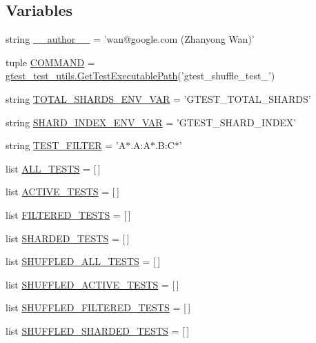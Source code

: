 \subsection*{\-Variables}
\begin{DoxyCompactItemize}
\item 
string \hyperlink{namespacegtest__shuffle__test_a629d61dfe4da763164a4d1a2d85b0afd}{\-\_\-\-\_\-author\-\_\-\-\_\-} = 'wan@google.\-com (\-Zhanyong \-Wan)'
\item 
tuple \hyperlink{namespacegtest__shuffle__test_add010199942a26d17bd560c1ce462eeb}{\-C\-O\-M\-M\-A\-N\-D} = \hyperlink{namespacegtest__test__utils_a1bdf3cac86afa675ed37629b183048e9}{gtest\-\_\-test\-\_\-utils.\-Get\-Test\-Executable\-Path}('gtest\-\_\-shuffle\-\_\-test\-\_\-')
\item 
string \hyperlink{namespacegtest__shuffle__test_a29eb92c501c01a11bd57180093e5548f}{\-T\-O\-T\-A\-L\-\_\-\-S\-H\-A\-R\-D\-S\-\_\-\-E\-N\-V\-\_\-\-V\-A\-R} = '\-G\-T\-E\-S\-T\-\_\-\-T\-O\-T\-A\-L\-\_\-\-S\-H\-A\-R\-D\-S'
\item 
string \hyperlink{namespacegtest__shuffle__test_a8eb464868f4a78b232279d364ad58b55}{\-S\-H\-A\-R\-D\-\_\-\-I\-N\-D\-E\-X\-\_\-\-E\-N\-V\-\_\-\-V\-A\-R} = '\-G\-T\-E\-S\-T\-\_\-\-S\-H\-A\-R\-D\-\_\-\-I\-N\-D\-E\-X'
\item 
string \hyperlink{namespacegtest__shuffle__test_a3a2a8dc2d370668d96277c3599910959}{\-T\-E\-S\-T\-\_\-\-F\-I\-L\-T\-E\-R} = '\-A$\ast$.\-A\-:\-A$\ast$.\-B\-:\-C$\ast$'
\item 
list \hyperlink{namespacegtest__shuffle__test_a18b8b804578036b31674b8f9bf24a29d}{\-A\-L\-L\-\_\-\-T\-E\-S\-T\-S} = \mbox{[}$\,$\mbox{]}
\item 
list \hyperlink{namespacegtest__shuffle__test_a10a0fc6f90e8342edb66ea225cee9164}{\-A\-C\-T\-I\-V\-E\-\_\-\-T\-E\-S\-T\-S} = \mbox{[}$\,$\mbox{]}
\item 
list \hyperlink{namespacegtest__shuffle__test_aba3048b72eb8c3d3541edeeb029583fe}{\-F\-I\-L\-T\-E\-R\-E\-D\-\_\-\-T\-E\-S\-T\-S} = \mbox{[}$\,$\mbox{]}
\item 
list \hyperlink{namespacegtest__shuffle__test_acd9dfcf11205c6515a58a32b47c3ce6e}{\-S\-H\-A\-R\-D\-E\-D\-\_\-\-T\-E\-S\-T\-S} = \mbox{[}$\,$\mbox{]}
\item 
list \hyperlink{namespacegtest__shuffle__test_a0196db00bad91c1de26b76d6bbc12207}{\-S\-H\-U\-F\-F\-L\-E\-D\-\_\-\-A\-L\-L\-\_\-\-T\-E\-S\-T\-S} = \mbox{[}$\,$\mbox{]}
\item 
list \hyperlink{namespacegtest__shuffle__test_a8cf08e8bd22e7c597b4ab555204f682f}{\-S\-H\-U\-F\-F\-L\-E\-D\-\_\-\-A\-C\-T\-I\-V\-E\-\_\-\-T\-E\-S\-T\-S} = \mbox{[}$\,$\mbox{]}
\item 
list \hyperlink{namespacegtest__shuffle__test_a3682eb6c6aa63cde23c7eaf3f1d1cc78}{\-S\-H\-U\-F\-F\-L\-E\-D\-\_\-\-F\-I\-L\-T\-E\-R\-E\-D\-\_\-\-T\-E\-S\-T\-S} = \mbox{[}$\,$\mbox{]}
\item 
list \hyperlink{namespacegtest__shuffle__test_a53dc4a1bbcc3973a981937e26af48538}{\-S\-H\-U\-F\-F\-L\-E\-D\-\_\-\-S\-H\-A\-R\-D\-E\-D\-\_\-\-T\-E\-S\-T\-S} = \mbox{[}$\,$\mbox{]}
\end{DoxyCompactItemize}


